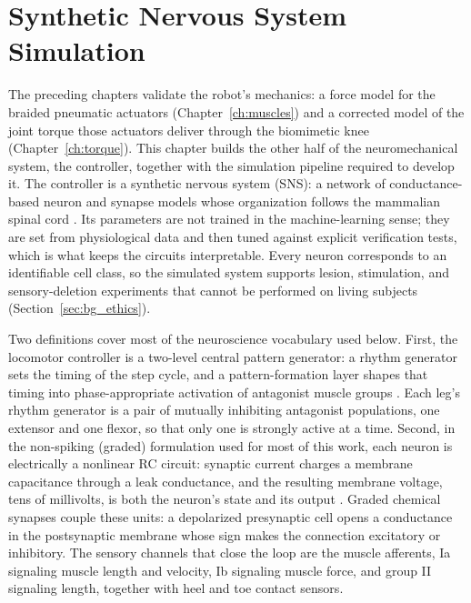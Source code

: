 ﻿\chapter{Synthetic Nervous System Simulation}\label{ch:sns}
\graphicspath{{../Figures/60-sns/}{figs/60-sns/}{../Figures/60-sns/AnimatLab_reference/}{figs/60-sns/AnimatLab_reference/}}

The preceding chapters validate the robot's mechanics: a force model for the braided pneumatic actuators (Chapter~\ref{ch:muscles}) and a corrected model of the joint torque those actuators deliver through the biomimetic knee (Chapter~\ref{ch:torque}). This chapter builds the other half of the neuromechanical system, the controller, together with the simulation pipeline required to develop it. The controller is a synthetic nervous system (SNS): a network of conductance-based neuron and synapse models whose organization follows the mammalian spinal cord \citep{rybak_modelling_2006, mccrea_organization_2008, deng_neuromechanical_2019}. Its parameters are not trained in the machine-learning sense; they are set from physiological data and then tuned against explicit verification tests, which is what keeps the circuits interpretable. Every neuron corresponds to an identifiable cell class, so the simulated system supports lesion, stimulation, and sensory-deletion experiments that cannot be performed on living subjects (Section~\ref{sec:bg_ethics}).

Two definitions cover most of the neuroscience vocabulary used below. First, the locomotor controller is a two-level central pattern generator: a rhythm generator sets the timing of the step cycle, and a pattern-formation layer shapes that timing into phase-appropriate activation of antagonist muscle groups \citep{rybak_modelling_2006}. Each leg's rhythm generator is a pair of mutually inhibiting antagonist populations, one extensor and one flexor, so that only one is strongly active at a time. Second, in the non-spiking (graded) formulation used for most of this work, each neuron is electrically a nonlinear RC circuit: synaptic current charges a membrane capacitance through a leak conductance, and the resulting membrane voltage, tens of millivolts, is both the neuron's state and its output \citep{nourse_sns_2023}. Graded chemical synapses couple these units: a depolarized presynaptic cell opens a conductance in the postsynaptic membrane whose sign makes the connection excitatory or inhibitory. The sensory channels that close the loop are the muscle afferents, Ia signaling muscle length and velocity, Ib signaling muscle force, and group II signaling length, together with heel and toe contact sensors.

